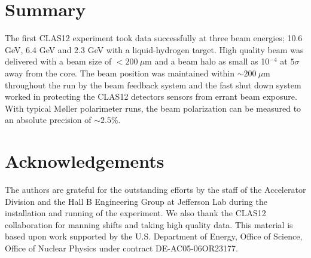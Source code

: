 \documentclass[final,3p,times,twocolumn]{elsarticle}
\begin{document}

\newpage

\linenumbers









\section{Summary}

The first CLAS12 experiment took data successfully at three beam energies; 10.6 GeV, 6.4 GeV and 2.3 GeV with a liquid-hydrogen 
target. High quality beam was delivered with a beam size of $< 200~\mu$m and a beam halo as small as 10$^{-4}$ at $5\sigma$ away from the core. The beam 
position was maintained within $\sim 200~\mu$m throughout the run  by the beam feedback system and the fast shut down system 
worked in protecting the CLAS12 detectors sensors from errant beam exposure. With typical M{\o}ller polarimeter runs, the beam 
polarization can be measured to an absolute precision of $\sim 2.5\%$. 

\section{Acknowledgements}

The authors are grateful for the outstanding efforts by the staff of the Accelerator Division and the Hall B Engineering Group at Jefferson Lab during the installation and running of the experiment. We also thank the CLAS12 collaboration for manning shifts and taking high quality data.
This material is based upon work supported by the U.S. Department of Energy, Office of Science, Office of Nuclear Physics under contract DE-AC05-06OR23177.





%


%


\end{document}
